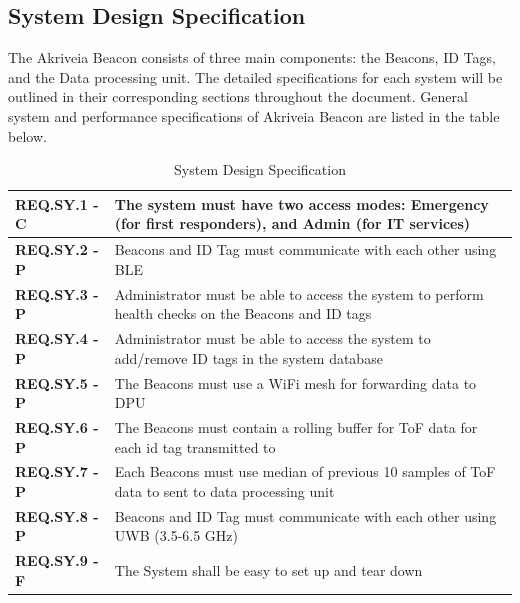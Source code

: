 \pagebreak
\subsection{System Design Specification}
\medskip
The Akriveia Beacon consists of three main components: the Beacons, ID Tags, and the Data processing unit. The detailed specifications for each system will be outlined in their corresponding sections throughout the document. General system and performance specifications of Akriveia Beacon are listed in the table below.
\medskip
\bgroup
\def\arraystretch{1.5}
\begin{table}[H]
\centering
\begin{tabular}{ | m{3cm} | m{12.5cm} |}
\hline
\textbf{REQ.SY.1 - C} & The system must have two access modes: Emergency (for first responders), and Admin (for IT services)\\
\hline
\textbf{REQ.SY.2 - P} & Beacons and ID Tag must communicate with each other using BLE\\
\hline
\textbf{REQ.SY.3 - P} & Administrator must be able to access the system to perform health checks on the Beacons and ID tags \\
\hline
\textbf{REQ.SY.4 - P} & Administrator must be able to access the system to add/remove ID tags in the system database \\
\hline
\textbf{REQ.SY.5 - P} & The Beacons must use a WiFi mesh for forwarding data to DPU\\
\hline
\textbf{REQ.SY.6 - P} & The Beacons must contain a rolling buffer for ToF data for each id tag transmitted to\\
\hline
\textbf{REQ.SY.7 - P} & Each Beacons must use median of previous 10 samples of ToF data to sent to data processing unit\\
\hline
\textbf{REQ.SY.8 - P} & Beacons and ID Tag must communicate with each other using UWB (3.5-6.5 GHz)\\
\hline
\textbf{REQ.SY.9 - F} & The System shall be easy to set up and tear down\\
\hline
\end{tabular}
\caption{System Design Specification}
\end{table}
















